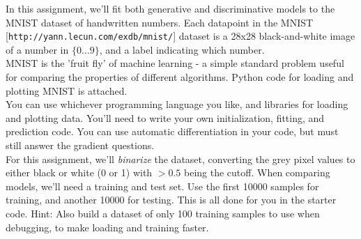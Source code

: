 \documentclass{harvardml}
\theoremstyle{plain}
\begin{document}
In this assignment, we'll fit both generative and discriminative models to the MNIST dataset of handwritten numbers.
Each datapoint in the MNIST [\texttt{http://yann.lecun.com/exdb/mnist/}] dataset is a 28x28 black-and-white image of a number in $\{0 \dots 9\}$, and a label indicating which number.\\

MNIST is the 'fruit fly' of machine learning - a simple standard problem useful for comparing the properties of different algorithms.
Python code for loading and plotting MNIST is attached.\\

You can use whichever programming language you like, and libraries for loading and plotting data.
You'll need to write your own initialization, fitting, and prediction code.
You can use automatic differentiation in your code, but must still answer the gradient questions.\\

For this assignment, we'll \emph{binarize} the dataset, converting the grey pixel values to either black or white (0 or 1) with $> 0.5$ being the cutoff.
When comparing models, we'll need a training and test set.  Use the first 10000 samples for training, and another 10000 for testing. This is all done for you in the starter code. Hint: Also build a dataset of only 100 training samples to use when debugging, to make loading and training faster.




\end{document}
